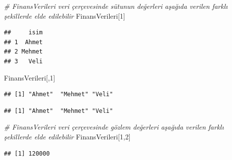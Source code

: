 \documentclass[
]{book}
\newenvironment{Shaded}{\begin{snugshade}}{\end{snugshade}}
\newcommand{\CommentTok}[1]{\textcolor[rgb]{0.56,0.35,0.01}{\textit{#1}}}
\newcommand{\DecValTok}[1]{\textcolor[rgb]{0.00,0.00,0.81}{#1}}
\newcommand{\NormalTok}[1]{#1}
\newcommand{\SpecialCharTok}[1]{\textcolor[rgb]{0.81,0.36,0.00}{\textbf{#1}}}
\begin{document}
\begin{Shaded}
\begin{Highlighting}[]
\CommentTok{\# FinansVerileri veri çerçevesinde sütunun değerleri aşağıda verilen farklı şekillerde elde edilebilir }
\NormalTok{FinansVerileri[}\DecValTok{1}\NormalTok{]}
\end{Highlighting}
\end{Shaded}

\begin{verbatim}
##     isim
## 1  Ahmet
## 2 Mehmet
## 3   Veli
\end{verbatim}

\begin{Shaded}
\begin{Highlighting}[]
\NormalTok{FinansVerileri[,}\DecValTok{1}\NormalTok{]}
\end{Highlighting}
\end{Shaded}

\begin{verbatim}
## [1] "Ahmet"  "Mehmet" "Veli"
\end{verbatim}

\begin{Shaded}
\end{Shaded}

\begin{verbatim}
## [1] "Ahmet"  "Mehmet" "Veli"
\end{verbatim}

\begin{Shaded}
\begin{Highlighting}[]
\CommentTok{\# FinansVerileri veri çerçevesinde gözlem değerleri aşağıda verilen farklı şekillerde elde edilebilir }
\NormalTok{FinansVerileri[}\DecValTok{1}\NormalTok{,}\DecValTok{2}\NormalTok{]}
\end{Highlighting}
\end{Shaded}

\begin{verbatim}
## [1] 120000
\end{verbatim}

\begin{Shaded}
\end{Shaded}
\end{document}
